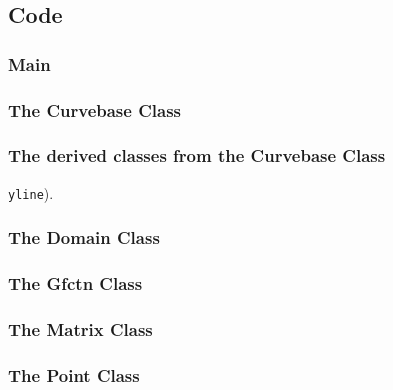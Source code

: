 \documentclass[a4paper,10pt]{article}
\begin{document}
\FloatBarrier
\newpage
\subsection*{Code}
\subsubsection*{Main}

\subsubsection*{The Curvebase Class}


\subsubsection*{The derived classes from the Curvebase Class}
\texttt{yline}).

%

%


\subsubsection*{The Domain Class}



\subsubsection*{The Gfctn Class}



\subsubsection*{The Matrix Class}



\subsubsection*{The Point Class}


\end{document}
